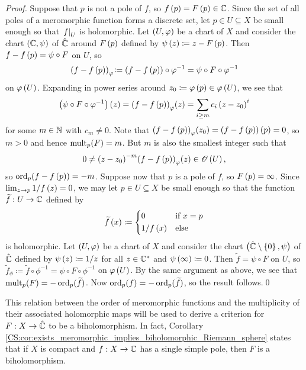 \documentclass[../Moduli_Spaces_of_Riemann_Surfaces.tex]{subfiles}
\begin{document}
    \begin{proof}
        Suppose that $p$ is not a pole of $f$, so $f\left(p\right)=F\left(p\right)\in\mathbb{C}$. Since the set of all poles of a meromorphic function forms a discrete set, let $p\in U\subseteq X$ be small enough so that $\left.f\right|_U$ is holomorphic. Let $\left(U,\varphi\right)$ be a chart of $X$ and consider the chart $\left(\mathbb{C},\psi\right)$ of $\hat{\mathbb{C}}$ around $F\left(p\right)$ defined by $\psi\left(z\right)\coloneqq z-F\left(p\right)$. Then $f-f\left(p\right)=\psi\circ F$ on $U$, so
        \begin{equation*}
            \left(f-f\left(p\right)\right)_\varphi\!\coloneqq\left(f-f\left(p\right)\right)\circ\varphi^{-1}=\psi\circ F\circ\varphi^{-1}
        \end{equation*}
        on $\varphi\left(U\right)$. Expanding in power series around $z_0\coloneqq\varphi\left(p\right)\in\varphi\left(U\right)$, we see that
        \begin{equation*}
            \left(\psi\circ F\circ\varphi^{-1}\right)\left(z\right)=\left(f-f\left(p\right)\right)_\varphi\!\left(z\right)=\sum_{i\geq m}c_i\left(z-z_0\right)^i
        \end{equation*}
        for some $m\in\mathbb{N}$ with $c_m\neq0$. Note that $\left(f-f\left(p\right)\right)_\varphi\!\left(z_0\right)=\left(f-f\left(p\right)\right)\left(p\right)=0$, so $m>0$ and hence $\operatorname{mult}_p\!\left(F\right)=m$. But $m$ is also the smallest integer such that
        \begin{equation*}
            0\neq\left(z-z_0\right)^{-m}\!\left(f-f\left(p\right)\right)_\varphi\!\left(z\right)\in\mathscr{O}\left(U\right),
        \end{equation*}
        so $\operatorname{ord}_p\!\left(f-f\left(p\right)\right)=-m$. Suppose now that $p$ is a pole of $f$, so $F\left(p\right)=\infty$. Since $\lim_{z\to p}1/f\left(z\right)=0$, we may let $p\in U\subseteq X$ be small enough so that the function $\widetilde{f}:U\to\mathbb{C}$ defined by
        \begin{equation*}
            \widetilde{f}\left(x\right)\coloneqq
            \begin{dcases}
                0 & \textrm{if }x=p \\
                1/f\left(x\right) & \textrm{else}
            \end{dcases}
        \end{equation*}
        is holomorphic. Let $\left(U,\varphi\right)$ be a chart of $X$ and consider the chart $\big(\hat{\mathbb{C}}\setminus\left\{0\right\},\psi\big)$ of $\hat{\mathbb{C}}$ defined by $\psi\left(z\right)\coloneqq1/z$ for all $z\in\mathbb{C}^\ast$ and $\psi\left(\infty\right)\coloneqq0$. Then $\widetilde{f}=\psi\circ F$ on $U$, so $\widetilde{f}_\phi\!\coloneqq\widetilde{f}\circ\phi^{-1}=\psi\circ F\circ\phi^{-1}$ on $\varphi\left(U\right)$. By the same argument as above, we see that $\operatorname{mult}_p\!\left(F\right)=-\operatorname{ord}_p(\widetilde{f})$. Now $\operatorname{ord}_p\!\left(f\right)=-\operatorname{ord}_p(\widetilde{f})$, so the result follows.\qed
    \end{proof}
    \begin{remark}
        This relation between the order of meromorphic functions and the multiplicity of their associated holomorphic maps will be used to derive a criterion for $F:X\to\hat{\mathbb{C}}$ to be a biholomorphism. In fact, Corollary \ref{CS:cor:exists_meromorphic_implies_biholomorphic_Riemann_sphere} states that if $X$ is compact and $f:X\to\mathbb{C}$ has a single simple pole, then $F$ is a biholomorphism.\exqed
    \end{remark}
\end{document}
